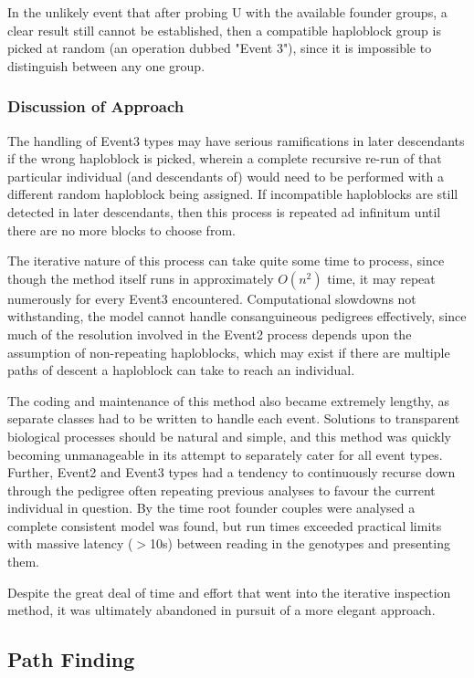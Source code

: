 In the unlikely event that after probing U with the available founder groups, a clear result still cannot be established, then a compatible haploblock group is picked at random (an operation dubbed "Event 3"), since it is impossible to distinguish between any one group.


\subsubsection{Discussion of Approach}\label{ref:haplo:eventdiscuss}
The handling of Event3 types may have serious ramifications in later descendants if the wrong haploblock is picked, wherein a complete recursive re-run of that particular individual (and descendants of) would need to be performed with a different random haploblock being assigned. If incompatible haploblocks are still detected in later descendants, then this process is repeated ad infinitum until there are no more blocks to choose from. 

The iterative nature of this process can take quite some time to process, since though the method itself runs in approximately $O(n^2)$ time, it may repeat numerously for every Event3 encountered. Computational slowdowns not withstanding, the model cannot handle consanguineous pedigrees effectively, since much of the resolution involved in the Event2 process depends upon the assumption of non-repeating haploblocks, which may exist if there are multiple paths of descent a haploblock can take to reach an individual.

The coding and maintenance of this method also became extremely lengthy, as separate classes had to be written to handle each event. Solutions to transparent biological processes should be natural and simple, and this method was quickly becoming unmanageable in its attempt to separately cater for all event types. Further, Event2 and Event3 types had a tendency to continuously recurse down through the pedigree often repeating previous analyses to favour the current individual in question. By the time root founder couples were analysed a complete consistent model was found, but run times exceeded practical limits with massive latency ($>$10s) between reading in the genotypes and presenting them.

Despite the great deal of time and effort that went into the iterative inspection method, it was ultimately abandoned in pursuit of a more elegant approach.

\subsection{Path Finding}

